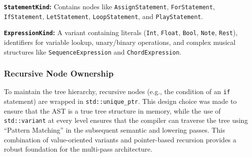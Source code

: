 \noindent \textbf{\texttt{StatementKind}:} Contains nodes like \texttt{AssignStatement}, \texttt{ForStatement},
\texttt{IfStatement}, \texttt{LetStatement}, \texttt{LoopStatement}, and \texttt{PlayStatement}.

\noindent \textbf{\texttt{ExpressionKind}:} A variant containing literals (\texttt{Int}, \texttt{Float}, \texttt{Bool},
\texttt{Note}, \texttt{Rest}), identifiers for variable lookup, unary/binary operations, and complex musical
structures like \texttt{SequenceExpression} and \texttt{ChordExpression}.

\subsubsection{Recursive Node Ownership}

To maintain the tree hierarchy, recursive nodes (e.g., the condition of an \texttt{if} statement) are wrapped in
\texttt{std::unique\_ptr}.
This design choice was made to ensure that the AST is a true tree structure in memory, while the use of
\texttt{std::variant} at every level ensures that the compiler can traverse the tree using ``Pattern Matching'' in the
subsequent semantic and lowering passes.
This combination of value-oriented variants and pointer-based recursion provides a robust foundation for the multi-pass
architecture.
